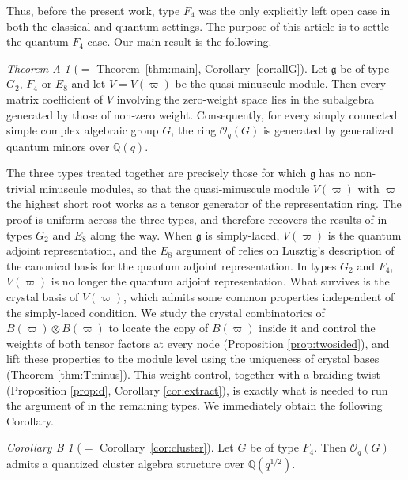 \documentclass[12pt]{amsart}
\theoremstyle{plain}
\theoremstyle{remark}
\newtheorem*{theoremA}{Theorem A}
\newtheorem*{corollaryB}{Corollary B}
\newcommand{\g}{\mathfrak{g}}
\newcommand{\ot}{\otimes}
\newcommand{\vp}{\varpi}
\begin{document}
Thus, before the present work, type
$F_4$ was the only explicitly left open case in both the classical and quantum settings. The purpose of this article is to settle the quantum $F_4$ case. Our main
result is the following.
\begin{theoremA}[$=$ Theorem~\ref{thm:main}, Corollary~\ref{cor:allG}]
Let $\g$ be of type $G_2$, $F_4$ or $E_8$ and let $V=V(\vp)$ be the quasi-minuscule
module. Then every matrix coefficient of $V$ involving the zero-weight space lies in
the subalgebra generated by those of non-zero weight. Consequently, for every simply
connected simple complex algebraic group $G$, the ring $\mathcal{O}_q(G)$ is generated
by generalized quantum minors over $\mathbb{Q}(q)$.
\end{theoremA}
The three types treated together are precisely those for which $\g$ has no non-trivial minuscule modules, so
that the quasi-minuscule module $V(\vp)$ with $\vp$ the highest short root works as a tensor generator of the representation ring. The proof is uniform across the
three types, and therefore recovers the results of \cite[Theorems~5.7 and~5.9]{OQY} in
types $G_2$ and $E_8$ along the way. When $\g$ is simply-laced, $V(\vp)$ is the quantum adjoint representation, and the $E_8$ argument of
\cite{OQY} relies on Lusztig's description of the canonical basis for the quantum adjoint representation. In types $G_2$ and $F_4$, $V(\vp)$ is no longer the quantum adjoint representation. What survives is the crystal basis of $V(\vp)$, which
admits some common properties independent of the simply-laced condition. We study the crystal combinatorics of $B(\vp)\ot B(\vp)$  to locate the copy of $B(\vp)$
inside it and control the weights of both tensor factors at every node
(Proposition \ref{prop:twosided}), and lift these properties to the module level using the uniqueness of crystal bases (Theorem \ref{thm:Tminus}). This weight control, together with a braiding twist (Proposition \ref{prop:d}, Corollary \ref{cor:extract}), is exactly what is needed to run
the argument of \cite[Theorem~5.9]{OQY} in the remaining types. We immediately obtain the following Corollary.

\begin{corollaryB}[$=$ Corollary~\ref{cor:cluster}]
Let $G$ be of type $F_4$. Then $\mathcal{O}_q(G)$ admits a quantized cluster algebra
structure over $\mathbb{Q}(q^{1/2})$.
\end{corollaryB}
\end{document}
